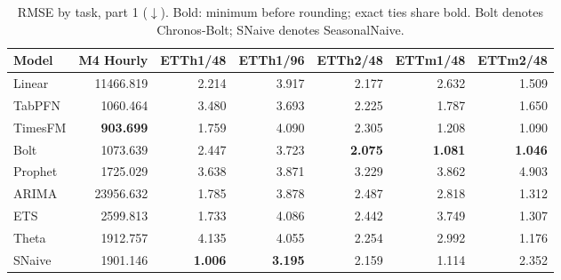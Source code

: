 \begin{table}[!htbp]
\centering
\caption{RMSE by task, part 1 ($\downarrow$). Bold: minimum before rounding; exact ties share bold. Bolt denotes Chronos-Bolt; SNaive denotes SeasonalNaive.}
\label{tab:rmse1}
\small
\setlength{\tabcolsep}{3.5pt}
\begin{tabular}{lrrrrrr}
\hline
Model & M4 Hourly & ETTh1/48 & ETTh1/96 & ETTh2/48 & ETTm1/48 & ETTm2/48 \\
\hline
Linear & 11466.819 & 2.214 & 3.917 & 2.177 & 2.632 & 1.509 \\
TabPFN & 1060.464 & 3.480 & 3.693 & 2.225 & 1.787 & 1.650 \\
TimesFM & \textbf{903.699} & 1.759 & 4.090 & 2.305 & 1.208 & 1.090 \\
Bolt & 1073.639 & 2.447 & 3.723 & \textbf{2.075} & \textbf{1.081} & \textbf{1.046} \\
Prophet & 1725.029 & 3.638 & 3.871 & 3.229 & 3.862 & 4.903 \\
ARIMA & 23956.632 & 1.785 & 3.878 & 2.487 & 2.818 & 1.312 \\
ETS & 2599.813 & 1.733 & 4.086 & 2.442 & 3.749 & 1.307 \\
Theta & 1912.757 & 4.135 & 4.055 & 2.254 & 2.992 & 1.176 \\
SNaive & 1901.146 & \textbf{1.006} & \textbf{3.195} & 2.159 & 1.114 & 2.352 \\
\hline
\end{tabular}
\end{table}
